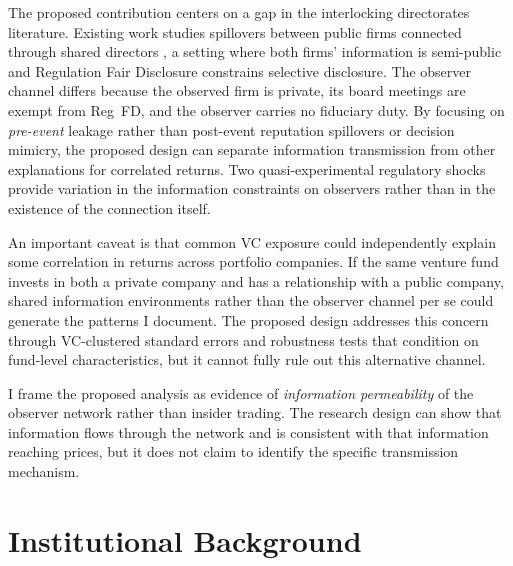 \documentclass[12pt]{article}
\begin{document}
The proposed contribution centers on a gap in the interlocking directorates literature. Existing work studies spillovers between public firms connected through shared directors \cite{kang2008director,shi2025shared,fracassi2017corporate}, a setting where both firms' information is semi-public and Regulation Fair Disclosure constrains selective disclosure. The observer channel differs because the observed firm is private, its board meetings are exempt from Reg~FD, and the observer carries no fiduciary duty. By focusing on \textit{pre-event} leakage rather than post-event reputation spillovers or decision mimicry, the proposed design can separate information transmission from other explanations for correlated returns. Two quasi-experimental regulatory shocks provide variation in the information constraints on observers rather than in the existence of the connection itself.

An important caveat is that common VC exposure could independently explain some correlation in returns across portfolio companies. If the same venture fund invests in both a private company and has a relationship with a public company, shared information environments rather than the observer channel per se could generate the patterns I document. The proposed design addresses this concern through VC-clustered standard errors and robustness tests that condition on fund-level characteristics, but it cannot fully rule out this alternative channel.

I frame the proposed analysis as evidence of \textit{information permeability} of the observer network rather than insider trading. The research design can show that information flows through the network and is consistent with that information reaching prices, but it does not claim to identify the specific transmission mechanism.

\section{Institutional Background}
\label{sec:institutional}
\end{document}
